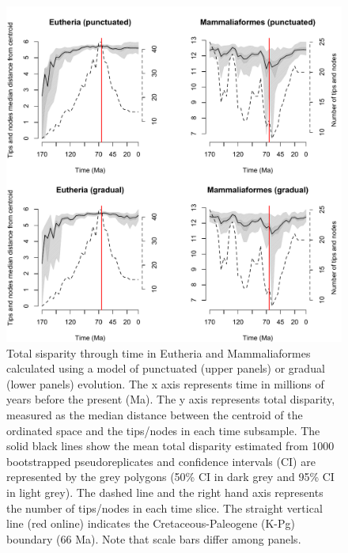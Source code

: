 \documentclass[12pt,letterpaper]{article}
\begin{document}
\begin{figure}[!htbp]
\centering
    \includegraphics[keepaspectratio=true]{Figures/Main_results.pdf}
\caption{\scriptsize{Total sisparity through time in Eutheria and Mammaliaformes calculated using a model of punctuated (upper panels) or gradual (lower panels) evolution. The x axis represents time in millions of years before the present (Ma). The y axis represents total disparity, measured as the median distance between the centroid of the ordinated space and the tips/nodes in each time subsample. The solid black lines show the mean total disparity estimated from 1000 bootstrapped pseudoreplicates and confidence intervals (CI) are represented by the grey polygons (50\% CI in dark grey and 95\% CI in light grey). The dashed line and the right hand axis represents the number of tips/nodes in each time slice. The straight vertical line (red online) indicates the Cretaceous-Paleogene (K-Pg) boundary (66 Ma). Note that scale bars differ among panels.}}
\label{fig:Fig_Raw_results}
\end{figure}

\end{document}
